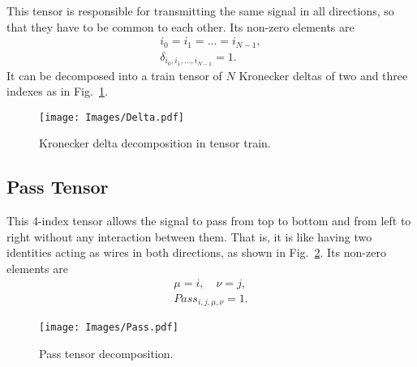 This tensor is responsible for transmitting the same signal in all directions, so that they have to be common to each other. Its non-zero elements are
\begin{equation}
    \begin{gathered}
        i_0 = i_1 = \dots = i_{N-1},\\
        \delta_{i_0, i_1, \dots, i_{N-1}} = 1. 
    \end{gathered}
\end{equation}
It can be decomposed into a train tensor of $N$ Kronecker deltas of two and three indexes as in Fig.~\ref{fig: Delta}.

\begin{figure}[h]
    \centering
    \texttt{[image: Images/Delta.pdf]}
    \caption{Kronecker delta decomposition in tensor train.}
    \label{fig: Delta}
\end{figure}

\subsection{Pass Tensor}
This 4-index tensor allows the signal to pass from top to bottom and from left to right without any interaction between them. That is, it is like having two identities acting as wires in both directions, as shown in Fig.~\ref{fig: Pass}. Its non-zero elements are
\begin{equation}
    \begin{gathered}
        \mu = i,\quad \nu = j,\\
        Pass_{i,j,\mu,\nu} = 1. 
    \end{gathered}
\end{equation}

\begin{figure}[h]
    \centering
    \texttt{[image: Images/Pass.pdf]}
    \caption{Pass tensor decomposition.}
    \label{fig: Pass}
\end{figure}

